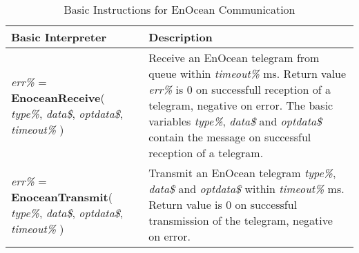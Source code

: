 \begin{table}[h!]
\centering
\caption{Basic Instructions for EnOcean Communication}
\label{Basic_Instructions_for_Enocean_Communication}
\begin{tabular}{|p{4cm}|p{10cm}|}
\hline
\textbf{Basic Interpreter} & \textbf{Description}                                                 
\\ \hline
\textit{err\%} = \textbf{EnoceanReceive}( \textit{type\%}, \textit{data\$}, \textit{optdata\$}, \textit{timeout\%} )
& Receive an EnOcean telegram from queue within \textit{timeout\%} ms. Return value \textit{err\%} is 0 on successfull reception of a telegram, negative on error. The basic variables \textit{type\%}, \textit{data\$} and \textit{optdata\$} contain the message on successful reception of a telegram.
\\ \hline
\textit{err\%} = \textbf{EnoceanTransmit}( \textit{type\%}, \textit{data\$}, \textit{optdata\$}, \textit{timeout\%} )
& Transmit an EnOcean telegram \textit{type\%}, \textit{data\$} and \textit{optdata\$} within \textit{timeout\%} ms. Return value is 0 on successful transmission of the telegram, negative on error. 
\\ \hline
\end{tabular}
\end{table}

